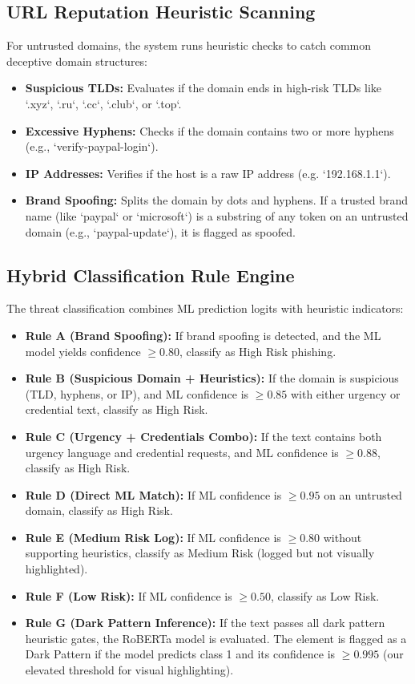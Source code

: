 \subsection{URL Reputation Heuristic Scanning}
For untrusted domains, the system runs heuristic checks to catch common deceptive domain structures:
\begin{itemize}
    \item \textbf{Suspicious TLDs:} Evaluates if the domain ends in high-risk TLDs like `.xyz`, `.ru`, `.cc`, `.club`, or `.top`.
    \item \textbf{Excessive Hyphens:} Checks if the domain contains two or more hyphens (e.g., `verify-paypal-login`).
    \item \textbf{IP Addresses:} Verifies if the host is a raw IP address (e.g. `192.168.1.1`).
    \item \textbf{Brand Spoofing:} Splits the domain by dots and hyphens. If a trusted brand name (like `paypal` or `microsoft`) is a substring of any token on an untrusted domain (e.g., `paypal-update`), it is flagged as spoofed.
\end{itemize}

\subsection{Hybrid Classification Rule Engine}
The threat classification combines ML prediction logits with heuristic indicators:
\begin{itemize}
    \item \textbf{Rule A (Brand Spoofing):} If brand spoofing is detected, and the ML model yields confidence $\ge 0.80$, classify as High Risk phishing.
    \item \textbf{Rule B (Suspicious Domain + Heuristics):} If the domain is suspicious (TLD, hyphens, or IP), and ML confidence is $\ge 0.85$ with either urgency or credential text, classify as High Risk.
    \item \textbf{Rule C (Urgency + Credentials Combo):} If the text contains both urgency language and credential requests, and ML confidence is $\ge 0.88$, classify as High Risk.
    \item \textbf{Rule D (Direct ML Match):} If ML confidence is $\ge 0.95$ on an untrusted domain, classify as High Risk.
    \item \textbf{Rule E (Medium Risk Log):} If ML confidence is $\ge 0.80$ without supporting heuristics, classify as Medium Risk (logged but not visually highlighted).
    \item \textbf{Rule F (Low Risk):} If ML confidence is $\ge 0.50$, classify as Low Risk.
    \item \textbf{Rule G (Dark Pattern Inference):} If the text passes all dark pattern heuristic gates, the RoBERTa model is evaluated. The element is flagged as a Dark Pattern if the model predicts class 1 and its confidence is $\ge 0.995$ (our elevated threshold for visual highlighting).
\end{itemize}

